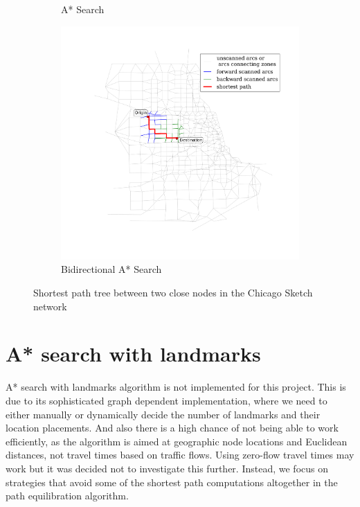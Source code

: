 \begin{figure}
\begin{subfigure}{.5\textwidth}
        \caption{A* Search}
        \label{fig:chicago_astar2}
    \end{subfigure}%
    \begin{subfigure}{.5\textwidth}
        \centering
        \includegraphics[width=\textwidth,trim=120px 120px 48px 0px,clip]{img/chicago_astar_bidirect2}
        \caption{Bidirectional A* Search}
        \label{fig:chicago_astar_bidirect2}
    \end{subfigure}
    \vspace{1em}
    \caption{Shortest path tree between two close nodes in the Chicago Sketch network}
    \label{fig:short_sptree}
\end{figure}

\section{A* search with landmarks}
A* search with landmarks algorithm is not implemented for this project.
This is due to its sophisticated graph dependent implementation,
where we need to either manually or dynamically decide the number of landmarks and their location placements.
And also there is a high chance of not being able to work efficiently,
as the algorithm is aimed at geographic node locations and Euclidean distances,
not travel times based on traffic flows.
Using zero-flow travel times may work but it was decided not to investigate this further.
Instead, we focus on strategies that avoid some of the shortest path computations altogether in the path equilibration algorithm.

